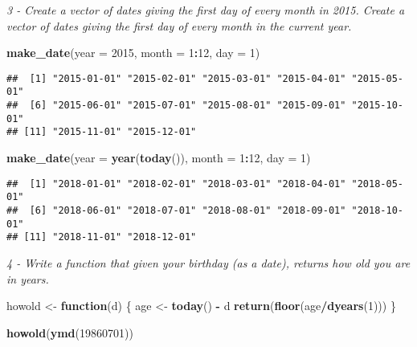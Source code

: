\documentclass[]{article}
\newenvironment{Shaded}{\begin{snugshade}}{\end{snugshade}}
\newcommand{\KeywordTok}[1]{\textcolor[rgb]{0.13,0.29,0.53}{\textbf{#1}}}
\newcommand{\DataTypeTok}[1]{\textcolor[rgb]{0.13,0.29,0.53}{#1}}
\newcommand{\DecValTok}[1]{\textcolor[rgb]{0.00,0.00,0.81}{#1}}
\newcommand{\StringTok}[1]{\textcolor[rgb]{0.31,0.60,0.02}{#1}}
\newcommand{\ControlFlowTok}[1]{\textcolor[rgb]{0.13,0.29,0.53}{\textbf{#1}}}
\newcommand{\OperatorTok}[1]{\textcolor[rgb]{0.81,0.36,0.00}{\textbf{#1}}}
\newcommand{\NormalTok}[1]{#1}
\theoremstyle{definition}
\theoremstyle{definition}
\theoremstyle{definition}
\theoremstyle{remark}
\begin{document}
\emph{3 - Create a vector of dates giving the first day of every month
in 2015. Create a vector of dates giving the first day of every month in
the current year.}

\begin{Shaded}
\begin{Highlighting}[]
\KeywordTok{make_date}\NormalTok{(}\DataTypeTok{year =} \DecValTok{2015}\NormalTok{, }\DataTypeTok{month =} \DecValTok{1}\OperatorTok{:}\DecValTok{12}\NormalTok{, }\DataTypeTok{day =} \DecValTok{1}\NormalTok{)}
\end{Highlighting}
\end{Shaded}

\begin{verbatim}
##  [1] "2015-01-01" "2015-02-01" "2015-03-01" "2015-04-01" "2015-05-01"
##  [6] "2015-06-01" "2015-07-01" "2015-08-01" "2015-09-01" "2015-10-01"
## [11] "2015-11-01" "2015-12-01"
\end{verbatim}

\begin{Shaded}
\begin{Highlighting}[]
\KeywordTok{make_date}\NormalTok{(}\DataTypeTok{year =} \KeywordTok{year}\NormalTok{(}\KeywordTok{today}\NormalTok{()), }\DataTypeTok{month =} \DecValTok{1}\OperatorTok{:}\DecValTok{12}\NormalTok{, }\DataTypeTok{day =} \DecValTok{1}\NormalTok{)}
\end{Highlighting}
\end{Shaded}

\begin{verbatim}
##  [1] "2018-01-01" "2018-02-01" "2018-03-01" "2018-04-01" "2018-05-01"
##  [6] "2018-06-01" "2018-07-01" "2018-08-01" "2018-09-01" "2018-10-01"
## [11] "2018-11-01" "2018-12-01"
\end{verbatim}

\emph{4 - Write a function that given your birthday (as a date), returns
how old you are in years.}

\begin{Shaded}
\begin{Highlighting}[]
\NormalTok{howold <-}\StringTok{ }\ControlFlowTok{function}\NormalTok{(d) \{}
\NormalTok{  age <-}\StringTok{ }\KeywordTok{today}\NormalTok{() }\OperatorTok{-}\StringTok{ }\NormalTok{d}
  \KeywordTok{return}\NormalTok{(}\KeywordTok{floor}\NormalTok{(age}\OperatorTok{/}\KeywordTok{dyears}\NormalTok{(}\DecValTok{1}\NormalTok{)))}
\NormalTok{\}}

\KeywordTok{howold}\NormalTok{(}\KeywordTok{ymd}\NormalTok{(}\DecValTok{19860701}\NormalTok{))}
\end{Highlighting}
\end{Shaded}
\end{document}
